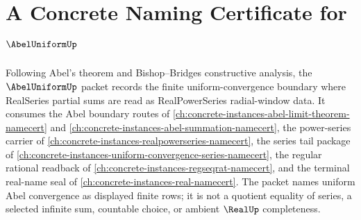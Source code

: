 \chapter{A Concrete Naming Certificate for $\AbelUniformUp$}
\label{ch:concrete-instances-abel-uniform-namecert}

Following Abel's theorem and Bishop--Bridges constructive analysis, the $\AbelUniformUp$ packet records the finite uniform-convergence boundary where RealSeries partial sums are read as RealPowerSeries radial-window data. It consumes the Abel boundary routes of \autoref{ch:concrete-instances-abel-limit-theorem-namecert} and \autoref{ch:concrete-instances-abel-summation-namecert}, the power-series carrier of \autoref{ch:concrete-instances-realpowerseries-namecert}, the series tail package of \autoref{ch:concrete-instances-uniform-convergence-series-namecert}, the regular rational readback of \autoref{ch:concrete-instances-regseqrat-namecert}, and the terminal real-name seal of \autoref{ch:concrete-instances-real-namecert}. The packet names uniform Abel convergence as displayed finite rows; it is not a quotient equality of series, a selected infinite sum, countable choice, or ambient $\RealUp$ completeness.

